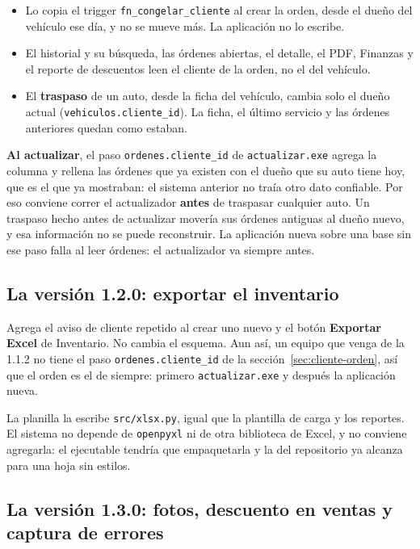 \documentclass[11pt,a4paper]{article}
\begin{document}
\begin{itemize}
  \item Lo copia el trigger \texttt{fn\_congelar\_cliente} al crear la orden, desde
        el dueño del vehículo ese día, y no se mueve más. La aplicación no lo
        escribe.
  \item El historial y su búsqueda, las órdenes abiertas, el detalle, el PDF,
        Finanzas y el reporte de descuentos leen el cliente de la orden, no el
        del vehículo.
  \item El \textbf{traspaso} de un auto, desde la ficha del vehículo, cambia solo
        el dueño actual (\texttt{vehiculos.cliente\_id}). La ficha, el último
        servicio y las órdenes anteriores quedan como estaban.
\end{itemize}

\textbf{Al actualizar}, el paso \texttt{ordenes.cliente\_id} de
\texttt{actualizar.exe} agrega la columna y rellena las órdenes que ya existen con
el dueño que su auto tiene hoy, que es el que ya mostraban: el sistema anterior
no traía otro dato confiable. Por eso conviene correr el actualizador
\textbf{antes} de traspasar cualquier auto. Un traspaso hecho antes de
actualizar movería sus órdenes antiguas al dueño nuevo, y esa información no se
puede reconstruir. La aplicación nueva sobre una base sin ese paso falla al leer
órdenes: el actualizador va siempre antes.

\subsection{La versión 1.2.0: exportar el inventario}

Agrega el aviso de cliente repetido al crear uno nuevo y el botón
\textbf{Exportar Excel} de Inventario. No cambia el esquema. Aun así, un equipo
que venga de la 1.1.2 no tiene el paso \texttt{ordenes.cliente\_id} de la
sección~\ref{sec:cliente-orden}, así que el orden es el de siempre: primero
\texttt{actualizar.exe} y después la aplicación nueva.

La planilla la escribe \texttt{src/xlsx.py}, igual que la plantilla de carga y
los reportes. El sistema no depende de \texttt{openpyxl} ni de otra biblioteca
de Excel, y no conviene agregarla: el ejecutable tendría que empaquetarla y la
del repositorio ya alcanza para una hoja sin estilos.

\subsection{La versión 1.3.0: fotos, descuento en ventas y captura de errores}
\end{document}
